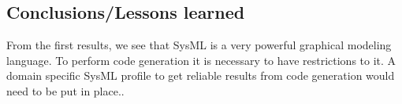 \subsection{Conclusions/Lessons learned}
From the first results, we see that SysML is a very powerful graphical modeling language. To perform code generation it is necessary to have restrictions to it. A domain specific SysML profile to get reliable results from code generation would need to be put in place..

